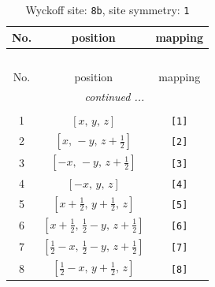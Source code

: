 \documentclass[fleqn,8pt]{jsarticle}
\begin{document}
\begin{longtable}{ccc}
\caption{Wyckoff site: {\tt 8b}, site symmetry: {\tt 1}}
 \\
 \hline \hline
No. & position & mapping \\ \hline \endfirsthead

\multicolumn{2}{l}{\tablename\ \thetable{}} \\
 \hline \hline
No. & position & mapping \\ \hline \endhead

 \hline \hline
\multicolumn{2}{r}{\footnotesize\it continued ...} \\ \endfoot

 \hline \hline
\multicolumn{2}{r}{} \\ \endlastfoot

1 & $\left[ x,\, y,\, z \right]$ & {\tt [1]} \\ \hline
2 & $\left[ x,\, - y,\, z + \frac{1}{2} \right]$ & {\tt [2]} \\ \hline
3 & $\left[ - x,\, - y,\, z + \frac{1}{2} \right]$ & {\tt [3]} \\ \hline
4 & $\left[ - x,\, y,\, z \right]$ & {\tt [4]} \\ \hline
5 & $\left[ x + \frac{1}{2},\, y + \frac{1}{2},\, z \right]$ & {\tt [5]} \\ \hline
6 & $\left[ x + \frac{1}{2},\, \frac{1}{2} - y,\, z + \frac{1}{2} \right]$ & {\tt [6]} \\ \hline
7 & $\left[ \frac{1}{2} - x,\, \frac{1}{2} - y,\, z + \frac{1}{2} \right]$ & {\tt [7]} \\ \hline
8 & $\left[ \frac{1}{2} - x,\, y + \frac{1}{2},\, z \right]$ & {\tt [8]} \\
\end{longtable}
\end{document}
